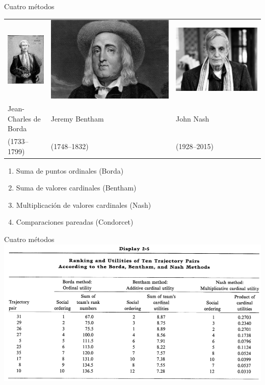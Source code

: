 \documentclass[bigger]{beamer}
\begin{document}
\begin{frame}[label={sec:orgf7da155}]{Cuatro métodos}
\begin{center}
\begin{tabular}{lll}
\includegraphics[width=.25\textwidth]{./pics/borda.jpg} & \includegraphics[width=.25\textwidth]{./pics/bentham.jpg} & \includegraphics[width=.25\textwidth]{./pics/nash.jpg}\\[0pt]
\tiny{Jean-Charles de Borda} & \tiny{Jeremy Bentham} & \tiny{John Nash}\\[0pt]
\tiny{(1733--1799)} & \tiny{(1748--1832)} & \tiny{(1928--2015)}\\[0pt]
\end{tabular}
\end{center}

\begin{enumerate}
\item Suma de puntos ordinales (Borda)
\item Suma de valores cardinales (Bentham)
\item Multiplicación de valores cardinales (Nash)
\item Comparaciones pareadas (Condorcet)
\end{enumerate}
\end{frame}
\begin{frame}[label={sec:org9672bfc}]{Cuatro métodos}
\centering
\includegraphics[width=\textwidth]{./pics/rk3.png}
\end{frame}
\end{document}

